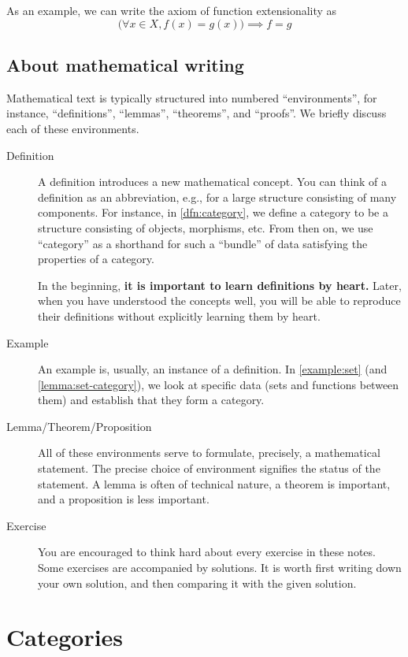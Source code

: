 \documentclass[a4paper,11pt, oneside,titlepage=false]{scrbook}
\theoremstyle{plain}
\theoremstyle{definition}
\begin{document}
As an example, we can write the axiom of function extensionality as
\[ \big(\forall x \in X, f(x) = g(x)\big) \implies f = g \]


\section{About mathematical writing}

Mathematical text is typically structured into numbered ``environments'', for instance, ``definitions'', ``lemmas'', ``theorems'', and ``proofs''.
We briefly discuss each of these environments.

\begin{description}
\item[Definition] A definition introduces a new mathematical concept. You can think of a definition as an abbreviation, e.g., for a large structure consisting of many components.
  For instance, in \cref{dfn:category}, we define a category to be a structure consisting of objects, morphisms, etc.
  From then on, we use ``category'' as a shorthand for such a ``bundle'' of data satisfying the properties of a category.

  In the beginning, \textbf{it is important to learn definitions by heart.} Later, when you have understood the concepts well, you will be able to reproduce their definitions without explicitly learning them by heart.
\item[Example] An example is, usually, an instance of a definition. In \cref{example:set} (and \cref{lemma:set-category}), we look at specific data (sets and functions between them) and establish that they form a category.
\item[Lemma/Theorem/Proposition] All of these environments serve to formulate, precisely, a mathematical statement.
  The precise choice of environment signifies the status of the statement.
  A lemma is often of technical nature, a theorem is important, and a proposition is less important.
\item[Exercise] You are encouraged to think hard about every exercise in these notes. Some exercises are accompanied by solutions. It is worth first writing down your own solution, and then comparing it with the given solution.
\end{description}

\chapter{Categories}
\label{sec:categories}
\end{document}
